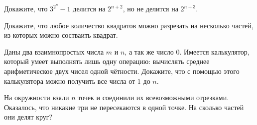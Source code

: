 \begin{problems}
\item Докажите, что $3^{2^n} - 1$ делится на $2^{n+2}$, но не делится на $2^{n+3}$.
\item Докажите,  что любое количество квадратов можно разрезать на несколько частей, из которых можно состваить квадрат.
\item Даны два взаимнопростых числа $m$ и $n$, а так же число 0. Имеется калькулятор, который умеет выполнять лишь одну операцию: вычислять среднее арифметическое двух чисел одной чётности. Докажите, что с помощью этого калькулятора можно получить все числа от $1$ до $n$.
\item  На окружности взяли $n$ точек и соединили их всевозможными отрезками. Оказалось, что никакие три не пересекаются в одной точке. На сколько частей они делят круг?
\end{problems}